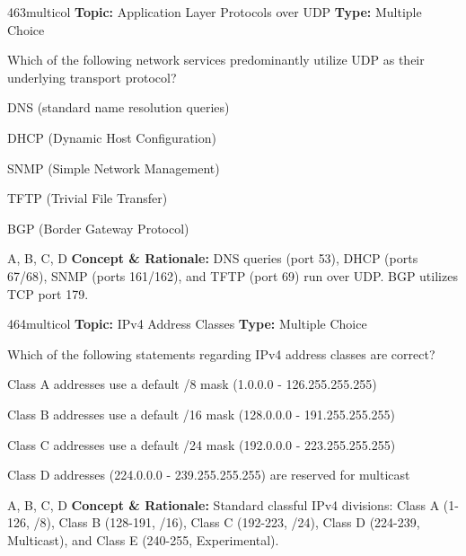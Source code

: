 \begin{qcard}{463}{multicol}
\textcolor{darkslate!75}{\small\textbf{Topic:} Application Layer Protocols over UDP \hfill \textbf{Type:} Multiple Choice}\vspace{0.4em}\par
Which of the following network services predominantly utilize UDP as their underlying transport protocol?
\begin{qoptions}
\item DNS (standard name resolution queries)
\item DHCP (Dynamic Host Configuration)
\item SNMP (Simple Network Management)
\item TFTP (Trivial File Transfer)
\item BGP (Border Gateway Protocol)
\end{qoptions}
\end{qcard}
\nopagebreak
\begin{explainbox}{A, B, C, D}
\textbf{Concept \& Rationale:} DNS queries (port 53), DHCP (ports 67/68), SNMP (ports 161/162), and TFTP (port 69) run over UDP. BGP utilizes TCP port 179.
\end{explainbox}

\begin{qcard}{464}{multicol}
\textcolor{darkslate!75}{\small\textbf{Topic:} IPv4 Address Classes \hfill \textbf{Type:} Multiple Choice}\vspace{0.4em}\par
Which of the following statements regarding IPv4 address classes are correct?
\begin{qoptions}
\item Class A addresses use a default /8 mask (1.0.0.0 - 126.255.255.255)
\item Class B addresses use a default /16 mask (128.0.0.0 - 191.255.255.255)
\item Class C addresses use a default /24 mask (192.0.0.0 - 223.255.255.255)
\item Class D addresses (224.0.0.0 - 239.255.255.255) are reserved for multicast
\end{qoptions}
\end{qcard}
\nopagebreak
\begin{explainbox}{A, B, C, D}
\textbf{Concept \& Rationale:} Standard classful IPv4 divisions: Class A (1-126, /8), Class B (128-191, /16), Class C (192-223, /24), Class D (224-239, Multicast), and Class E (240-255, Experimental).
\end{explainbox}

